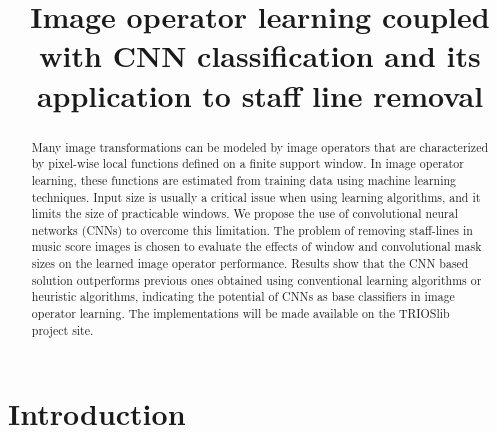 \documentclass[conference]{IEEEtran}
\begin{document}
\title{Image operator learning coupled with CNN classification and its
  application to staff line removal}


 \author{
}










\maketitle

\begin{abstract}
Many image transformations can be modeled by image operators that are
characterized by pixel-wise local functions defined on a finite
support window. In image operator learning, these functions are estimated
from training data using machine learning techniques. Input size is
usually a critical issue when using learning algorithms, and it limits
the size of practicable windows. We propose the use of convolutional
neural networks (CNNs) to overcome this limitation. The problem of
removing staff-lines in music score images is chosen to evaluate the
effects of window and convolutional mask sizes on the learned
image operator performance. Results show that the CNN based solution
outperforms previous ones obtained using conventional learning
algorithms or heuristic algorithms, indicating the potential of CNNs
as base classifiers in image operator learning. The implementations
will be made available on the TRIOSlib project site.
\end{abstract}



\IEEEpeerreviewmaketitle



\section{Introduction}
\end{document}
